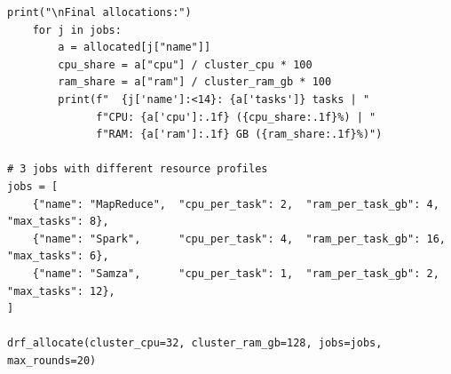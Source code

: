 \begin{lstlisting}[style=pyspark, caption={PE5.3: Dominant Resource Fairness (DRF) simulator}]
    print("\nFinal allocations:")
    for j in jobs:
        a = allocated[j["name"]]
        cpu_share = a["cpu"] / cluster_cpu * 100
        ram_share = a["ram"] / cluster_ram_gb * 100
        print(f"  {j['name']:<14}: {a['tasks']} tasks | "
              f"CPU: {a['cpu']:.1f} ({cpu_share:.1f}%) | "
              f"RAM: {a['ram']:.1f} GB ({ram_share:.1f}%)")

# 3 jobs with different resource profiles
jobs = [
    {"name": "MapReduce",  "cpu_per_task": 2,  "ram_per_task_gb": 4,   "max_tasks": 8},
    {"name": "Spark",      "cpu_per_task": 4,  "ram_per_task_gb": 16,  "max_tasks": 6},
    {"name": "Samza",      "cpu_per_task": 1,  "ram_per_task_gb": 2,   "max_tasks": 12},
]

drf_allocate(cluster_cpu=32, cluster_ram_gb=128, jobs=jobs, max_rounds=20)
\end{lstlisting}
